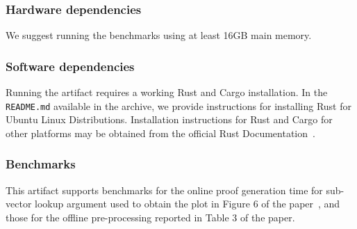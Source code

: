 \documentclass[sigconf]{acmart}
\begin{document}
	
	
	\subsubsection{Hardware dependencies}
	We suggest running the benchmarks using at least 16GB main memory.
	
	
	\subsubsection{Software dependencies}
	Running the artifact requires a working Rust and Cargo installation. In the {\tt README.md}
	available in the archive, we provide instructions for installing Rust for Ubuntu Linux Distributions.
	Installation instructions for Rust and Cargo for other platforms may be obtained from the official Rust Documentation~\cite{rust-doc}.

	
	
	\subsubsection{Benchmarks}
	This artifact supports benchmarks for the online proof generation time for sub-vector lookup argument
	used to obtain the plot in Figure 6 of the paper~\cite{full-ver}, and those for the offline pre-processing
	reported in Table 3 of the paper.
	
\end{document}
